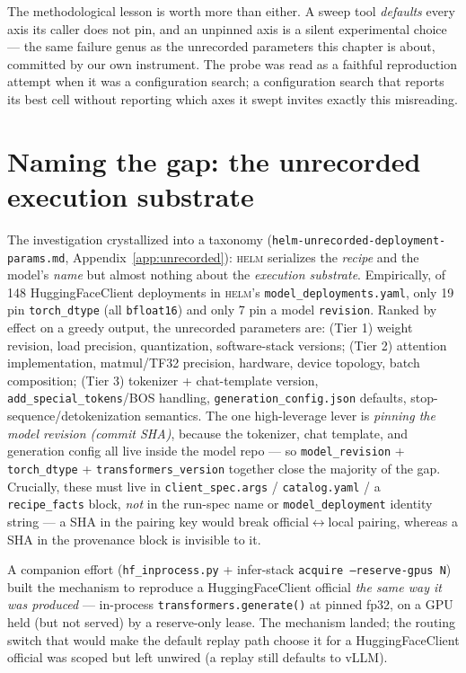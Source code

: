 \documentclass[11pt]{report}
\newcommand{\code}[1]{\texttt{#1}}
\newcommand{\file}[1]{\texttt{#1}}
\begin{document}
\noindent The methodological lesson is worth more than either. A sweep tool
\emph{defaults} every axis its caller does not pin, and an unpinned axis is a silent
experimental choice --- the same failure genus as the unrecorded parameters this
chapter is about, committed by our own instrument. The probe was read as a
faithful reproduction attempt when it was a configuration search; a configuration
search that reports its best cell without reporting which axes it swept invites
exactly this misreading.

\section{Naming the gap: the unrecorded execution substrate}
\label{sec:substrate}

The investigation crystallized into a taxonomy (\file{helm-unrecorded-deployment-
params.md}, Appendix~\ref{app:unrecorded}): \textsc{helm} serializes the
\emph{recipe} and the model's \emph{name} but almost nothing about the
\emph{execution substrate}. Empirically, of 148 HuggingFaceClient deployments in
\textsc{helm}'s \code{model\_deployments.yaml}, only 19 pin \code{torch\_dtype}
(all \code{bfloat16}) and only 7 pin a model \code{revision}. Ranked by effect on a
greedy output, the unrecorded parameters are: (Tier 1) weight revision, load
precision, quantization, software-stack versions; (Tier 2) attention implementation,
matmul/TF32 precision, hardware, device topology, batch composition; (Tier 3)
tokenizer + chat-template version, \code{add\_special\_tokens}/BOS handling,
\code{generation\_config.json} defaults, stop-sequence/detokenization semantics.
The one high-leverage lever is \emph{pinning the model revision (commit SHA)},
because the tokenizer, chat template, and generation config all live inside the
model repo --- so \code{model\_revision} + \code{torch\_dtype} +
\code{transformers\_version} together close the majority of the gap. Crucially,
these must live in \code{client\_spec.args} / \code{catalog.yaml} / a
\code{recipe\_facts} block, \emph{not} in the run-spec name or
\code{model\_deployment} identity string --- a SHA in the pairing key would break
official$\leftrightarrow$local pairing, whereas a SHA in the provenance block is
invisible to it.

A companion effort (\code{hf\_inprocess.py} + infer-stack
\code{acquire --reserve-gpus N}) built the mechanism to reproduce a
HuggingFaceClient official \emph{the same way it was produced} --- in-process
\code{transformers.generate()} at pinned fp32, on a GPU held (but not served) by a
reserve-only lease. The mechanism landed; the routing switch that would make the
default replay path choose it for a HuggingFaceClient official was scoped but left
unwired (a replay still defaults to vLLM).
\end{document}
